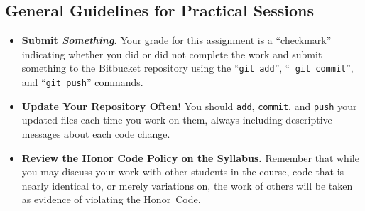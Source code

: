 \vspace*{-.15in}
\subsection*{General Guidelines for Practical Sessions}
\vspace*{-.05in}
\begin{itemize}
\item {\bf Submit \textbf{\textit{Something}}.} Your grade for this assignment is a ``checkmark'' indicating whether you
  did or did not complete the work and submit something to the Bitbucket repository using the ``{\tt git add}'', ``{\tt
    git commit}'', and ``{\tt git push}'' commands.

\item {\bf Update Your Repository Often!} You should {\tt add}, {\tt commit}, and {\tt push} your updated files each
  time you work on them, always including descriptive messages about each code change.

\item {\bf Review the Honor Code Policy on the Syllabus.} Remember that while you may discuss your work with other
  students in the course, code that is nearly identical to, or merely variations on, the work of others will be
  taken as evidence of violating the \mbox{Honor Code}.

\end{itemize}



